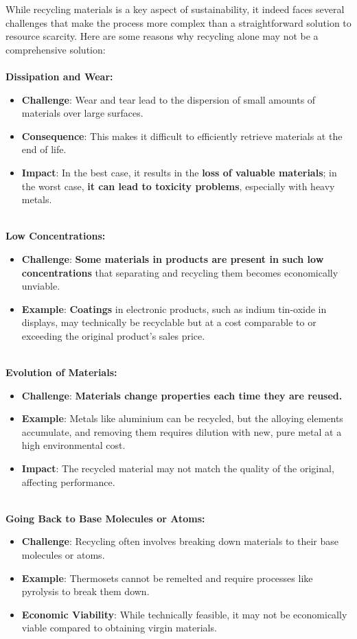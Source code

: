 \documentclass[../summary.tex]{subfiles}
\begin{document}
While recycling materials is a key aspect of sustainability, it indeed faces several challenges that make the process more complex than a straightforward solution to resource scarcity. Here are some reasons why recycling alone may not be a comprehensive solution:\\
\\
\textbf{Dissipation and Wear:}
\begin{itemize}
	\item \textbf{Challenge}: Wear and tear lead to the dispersion of small amounts of materials over large surfaces.
	\item \textbf{Consequence}: This makes it difficult to efficiently retrieve materials at the end of life.
	\item \textbf{Impact}: In the best case, it results in the \textbf{loss of valuable materials}; in the worst case, \textbf{it can lead to toxicity problems}, especially with heavy metals.
\end{itemize}
\ \\
\textbf{Low Concentrations:}
\begin{itemize}
	\item \textbf{Challenge}: \textbf{Some materials in products are present in such low concentrations} that separating and recycling them becomes economically unviable.
	\item \textbf{Example}: \textbf{Coatings} in electronic products, such as indium tin-oxide in displays, may technically be recyclable but at a cost comparable to or exceeding the original product's sales price.
\end{itemize}
\ \\
\textbf{Evolution of Materials:}
\begin{itemize}
	\item \textbf{Challenge}: \textbf{Materials change properties each time they are reused.}
	\item \textbf{Example}: Metals like aluminium can be recycled, but the alloying elements accumulate, and removing them requires dilution with new, pure metal at a high environmental cost.
	\item \textbf{Impact}: The recycled material may not match the quality of the original, affecting performance.
\end{itemize}
\ \\
\textbf{Going Back to Base Molecules or Atoms:}
\begin{itemize}
	\item \textbf{Challenge}: Recycling often involves breaking down materials to their base molecules or atoms.
	\item \textbf{Example}: Thermosets cannot be remelted and require processes like pyrolysis to break them down.
	\item \textbf{Economic Viability}: While technically feasible, it may not be economically viable compared to obtaining virgin materials.
\end{itemize}
\end{document}
